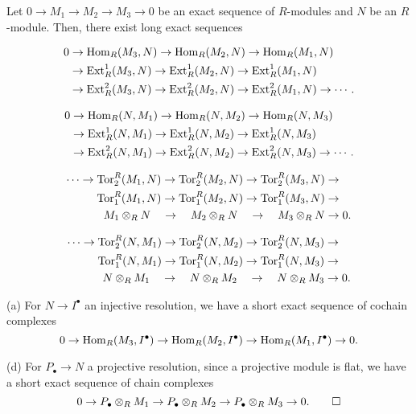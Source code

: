 \documentclass{../../small}
\begin{document}
\begin{thm*}[2.4.4]
Let $0\to M_1\to M_2\to M_3\to0$ be an exact sequence of $R$-modules and $N$ be an $R$-module.
Then, there exist long exact sequences
\begin{parts}
\item
\begin{align*}
0&\to\operatorname{Hom}_R(M_3,N)\to\operatorname{Hom}_R(M_2,N)\to\operatorname{Hom}_R(M_1,N)\\
&\to\operatorname{Ext}_R^1(M_3,N)\to\operatorname{Ext}_R^1(M_2,N)\to\operatorname{Ext}_R^1(M_1,N)\\
&\to\operatorname{Ext}_R^2(M_3,N)\to\operatorname{Ext}_R^2(M_2,N)\to\operatorname{Ext}_R^2(M_1,N)\to\cdots.
\end{align*}
\item
\begin{align*}
0&\to\operatorname{Hom}_R(N,M_1)\to\operatorname{Hom}_R(N,M_2)\to\operatorname{Hom}_R(N,M_3)\\
&\to\operatorname{Ext}_R^1(N,M_1)\to\operatorname{Ext}_R^1(N,M_2)\to\operatorname{Ext}_R^1(N,M_3)\\
&\to\operatorname{Ext}_R^2(N,M_1)\to\operatorname{Ext}_R^2(N,M_2)\to\operatorname{Ext}_R^2(N,M_3)\to\cdots.
\end{align*}
\item
\begin{align*}
\cdots\to\operatorname{Tor}^R_2(M_1,N)\to\operatorname{Tor}^R_2(M_2,N)\to\operatorname{Tor}^R_2(M_3,N)&\to\\
\operatorname{Tor}^R_1(M_1,N)\to\operatorname{Tor}^R_1(M_2,N)\to\operatorname{Tor}^R_1(M_3,N)&\to\\
M_1\otimes_RN\quad\to\quad M_2\otimes_RN\quad\to\quad M_3\otimes_RN&\to0.
\end{align*}
\item
\begin{align*}
\cdots\to\operatorname{Tor}^R_2(N,M_1)\to\operatorname{Tor}^R_2(N,M_2)\to\operatorname{Tor}^R_2(N,M_3)&\to\\
\operatorname{Tor}^R_1(N,M_1)\to\operatorname{Tor}^R_1(N,M_2)\to\operatorname{Tor}^R_1(N,M_3)&\to\\
N\otimes_RM_1\quad\to\quad N\otimes_RM_2\quad\to\quad N\otimes_RM_3&\to0.
\end{align*}
\end{parts}
\end{thm*}
\begin{pf}
(a)
For $N\to I^\bullet$ an injective resolution, we have a short exact sequence of cochain complexes
\[0\to\operatorname{Hom}_R(M_3,I^\bullet)\to\operatorname{Hom}_R(M_2,I^\bullet)\to\operatorname{Hom}_R(M_1,I^\bullet)\to0.\]

(d)
For $P_\bullet\to N$ a projective resolution, since a projective module is flat, we have a short exact sequence of chain complexes
\[0\to P_\bullet\otimes_RM_1\to P_\bullet\otimes_RM_2\to P_\bullet\otimes_RM_3\to0.\qedhere\]
\end{pf}
\end{document}
